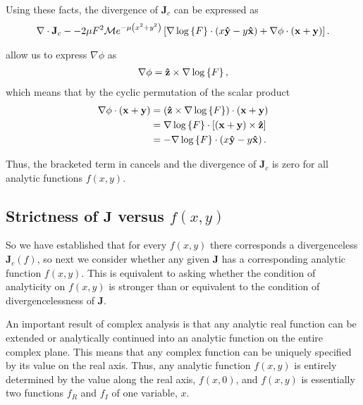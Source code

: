 Using these facts, the divergence of $\mathbf{J}_c$ can be expressed as
\begin{align}
    \nabla \cdot \mathbf{ J }_c - -2\mu F^2 \mathcal{M} e^{-\mu\left(x^2 + y^2\right)} \left[
        \nabla \log \left\{ F \right\} \cdot \left( x\mathbf{\hat y } - y\mathbf{\hat x } \right) + \nabla
        \phi \cdot \left( \mathbf{x} + \mathbf{y} \right) \right].
    \label{eqn:div-j}
\end{align}

 allow us to express $\nabla \phi$ as
\begin{align}
    \nabla \phi = \mathbf{\hat z } \times \nabla \log \left\{ F \right\},
\end{align}
which means that by the cyclic permutation of the scalar product
\begin{align}
    \nabla \phi \cdot \left( \mathbf{x} + \mathbf{y} \right)
    &= \left( \mathbf{\hat z } \times \nabla \log \left\{ F \right\} \right) \cdot \left( \mathbf{x} +
        \mathbf{y} \right) \\
    &= \nabla \log \left\{ F \right\} \cdot \left[ \left( \mathbf{x} + \mathbf{y} \right)
        \times \mathbf{\hat z } \right] \\
    &= - \nabla \log \left\{ F \right\} \cdot \left( x\mathbf{\hat y } - y\mathbf{\hat x } \right).
\end{align}

Thus, the bracketed term in  cancels and the divergence of
$\mathbf{J}_c$ is zero for all analytic functions $f(x,y)$.

\subsection{Strictness of $\mathbf{J}$ versus $f(x,y)$}

So we have established that for every $f(x,y)$ there corresponds a
divergenceless $\mathbf{J}_c(f)$, so next we consider whether any given
$\mathbf{J}$ has a corresponding analytic function $f(x,y)$. This is equivalent
to asking whether the condition of analyticity on $f(x,y)$ is stronger than or
equivalent to the condition of divergencelessness of $\mathbf{J}$.

An important result of complex analysis is that any analytic real function can
be extended or analytically continued into an analytic function on the entire
complex plane. This means that any complex function can be uniquely specified by
its value on the real axis. Thus, any analytic function $f(x,y)$ is entirely
determined by the value along the real axis, $f(x,0)$, and $f(x,y)$ is
essentially two functions $f_R$ and $f_I$ of one variable, $x$.

